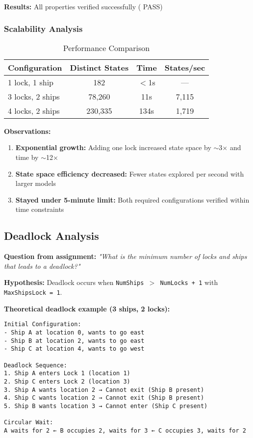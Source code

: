 \documentclass[12pt,a4paper]{article}
\begin{document}
\textbf{Results:} All properties verified successfully (\checkmark{} PASS)

\subsubsection{Scalability Analysis}

\begin{table}[h]
\centering
\begin{tabular}{lccc}
\toprule
\textbf{Configuration} & \textbf{Distinct States} & \textbf{Time} & \textbf{States/sec} \\
\midrule
1 lock, 1 ship & 182 & $<$1s & --- \\
3 locks, 2 ships & 78,260 & 11s & 7,115 \\
4 locks, 2 ships & 230,335 & 134s & 1,719 \\
\bottomrule
\end{tabular}
\caption{Performance Comparison}
\end{table}

\textbf{Observations:}

\begin{enumerate}
    \item \textbf{Exponential growth:} Adding one lock increased state space by $\sim$3× and time by $\sim$12×
    \item \textbf{State space efficiency decreased:} Fewer states explored per second with larger models
    \item \textbf{Stayed under 5-minute limit:} Both required configurations verified within time constraints
\end{enumerate}

\subsection{Deadlock Analysis}

\textbf{Question from assignment:} \textit{"What is the minimum number of locks and ships that leads to a deadlock?"}

\textbf{Hypothesis:} Deadlock occurs when \texttt{NumShips $>$ NumLocks + 1} with \texttt{MaxShipsLock = 1}.

\textbf{Theoretical deadlock example (3 ships, 2 locks):}

\begin{verbatim}
Initial Configuration:
- Ship A at location 0, wants to go east
- Ship B at location 2, wants to go east  
- Ship C at location 4, wants to go west

Deadlock Sequence:
1. Ship A enters Lock 1 (location 1)
2. Ship C enters Lock 2 (location 3)
3. Ship A wants location 2 → Cannot exit (Ship B present)
4. Ship C wants location 2 → Cannot exit (Ship B present)
5. Ship B wants location 3 → Cannot enter (Ship C present)

Circular Wait:
A waits for 2 ← B occupies 2, waits for 3 ← C occupies 3, waits for 2
\end{verbatim}
\end{document}
